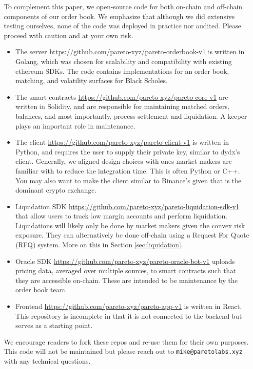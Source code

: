 \documentclass{article}
\begin{document}
To complement this paper, we open-source code for both on-chain and off-chain components of our order book. We emphasize that although we did extensive testing ourselves, none of the code was deployed in practice nor audited. Please proceed with caution and at your own risk.
\begin{itemize}
    \item The server \url{https://github.com/pareto-xyz/pareto-orderbook-v1} is written in Golang, which was chosen for scalability and compatibility with existing ethereum SDKs. The code contains implementations for an order book, matching, and volatility surfaces for Black Scholes.
    \item The smart contracts \url{https://github.com/pareto-xyz/pareto-core-v1} are written in Solidity, and are responsible for maintaining matched orders, balances, and most importantly, process settlement and liquidation. A keeper plays an important role in maintenance.
    \item  The client \url{https://github.com/pareto-xyz/pareto-client-v1} is written in Python, and requires the user to supply their private key, similar to dydx's client. Generally, we aligned design choices with ones market makers are familiar with to reduce the integration time. This is often Python or C++. You may also want to make the client similar to Binance's given that is the dominant crypto exchange.
   \item Liquidation SDK \url{https://github.com/pareto-xyz/pareto-liquidation-sdk-v1} that allow users to track low margin accounts and perform liquidation. Liquidations will likely only be done by market makers given the convex risk exposure. They can alternatively be done off-chain using a Request For Quote (RFQ) system. More on this in Section \ref{sec:liquidation}.
   \item Oracle SDK \url{https://github.com/pareto-xyz/pareto-oracle-bot-v1} uploads pricing data, averaged over multiple sources, to smart contracts such that they are accessible on-chain. These are intended to be maintenance by the order book team.
   \item Frontend \url{https://github.com/pareto-xyz/pareto-app-v1} is written in React. This repository is incomplete in that it is not connected to the backend but serves as a starting point. 
\end{itemize}

\noindent We encourage readers to fork these repos and re-use them for their own purposes. This code will not be maintained but please reach out to \texttt{mike@paretolabs.xyz} with any technical questions.
\end{document}
